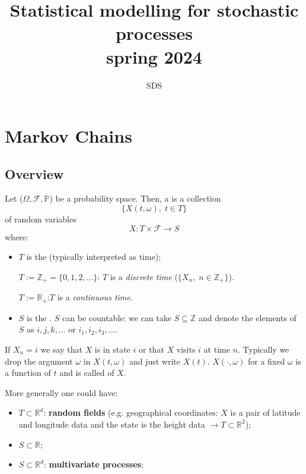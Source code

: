 \documentclass{article}
\begin{document}
\title{Statistical modelling for stochastic processes\\ spring 2024}
\author{SDS}
\date{}
\maketitle
\tableofcontents
\section{Markov Chains}
\subsection{Overview}
Let ($\Omega, \mathscr{F}, \mathbb{P}$) be a probability space. Then, a  is a collection 
\[\{X(t,\omega), \; t\in T\}\]
of random variables
\[X:T\times\mathscr{F} \longrightarrow S\]
where:
\begin{itemize}
    \item $T$ is the  (typically interpreted as time); 
    \begin{example}
        $T:= \mathbb{Z}_+=\{0,1,2,\ldots\}$: $T$ is a \textit{discrete time} ($\{X_n, \; n\in\mathbb{Z}_+\}$).
    \end{example}
    \begin{example}
        $T:=\mathbb{R_+}$:$T$ is a \textit{continuous time}.
    \end{example}
    \item $S$ is the . $S$ can be countable: we can take $S \subseteq \mathbb{Z}$ and denote the elements of $S$ as $i, j, k, \ldots$ or $i_1, i_2, i_3, \ldots$.
\end{itemize}
If $X_n=i$ we say that $X$ is in state $i$ or that $X$ visits $i$ at time $n$. Typically we drop the argument $\omega$ in $X(t,\omega)$ and just write $X(t)$. $X(\cdot,\omega)$ for a fixed $\omega$ is a function of $t$ and is called  of $X$.

More generally one could have:
\begin{itemize}
    \item $T \subset \mathbb{R}^d$: \textbf{random fields} (e.g. geographical coordinates: $X$ is a pair of latitude and longitude data and the state is the height data $\rightarrow T \subset \mathbb{R}^2$);
    \item $S \subset \mathbb{R}$;
    \item $S \subset \mathbb{R}^d$: \textbf{multivariate processes};
\end{itemize}
\end{document}
